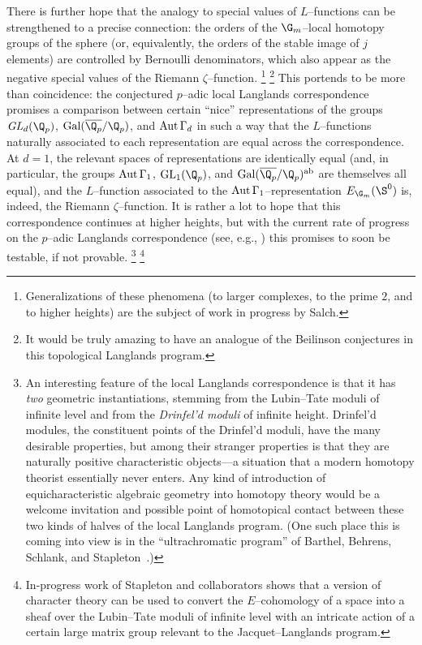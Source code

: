 There is further hope that the analogy to special values of \(L\)--functions can be strengthened to a precise connection: the orders of the \(\G_m\)--local homotopy groups of the sphere (or, equivalently, the orders of the stable image of \(j\) elements) are controlled by Bernoulli denominators, which also appear as the negative special values of the Riemann \(\zeta\)--function.%
\footnote{%
Generalizations of these phenomena (to larger complexes, to the prime \(2\), and to higher heights) are the subject of work in progress by Salch.
}%
\footnote{%
It would be truly amazing to have an analogue of the Beilinson conjectures in this topological Langlands program.
}
This portends to be more than coincidence: the conjectured \(p\)--adic local Langlands correspondence promises a comparison between certain ``nice'' representations of the groups \(\mathit{GL}_d(\Q_p)\), \(\operatorname{Gal}(\overline{\Q_p} / \Q_p)\), and \(\operatorname{Aut} \Gamma_d\) in such a way that the \(L\)--functions naturally associated to each representation are equal across the correspondence.
At \(d = 1\), the relevant spaces of representations are identically equal (and, in particular, the groups \(\operatorname{Aut} \Gamma_1\), \(\mathrm{GL}_1(\Q_p)\), and \(\operatorname{Gal}(\overline{\Q_p} / \Q_p)^{\mathrm{ab}}\) are themselves all equal), and the \(L\)--function associated to the \(\operatorname{Aut} \Gamma_1\)--representation \(E_{\G_m}(\S^0)\) is, indeed, the Riemann \(\zeta\)--function.
It is rather a lot to hope that this correspondence continues at higher heights, but with the current rate of progress on the \(p\)--adic Langlands correspondence (see, e.g., \cite{KnightThesis}) this promises to soon be testable, if not provable.%
\footnote{%
An interesting feature of the local Langlands correspondence is that it has \emph{two} geometric instantiations, stemming from the Lubin--Tate moduli of infinite level and from the \emph{Drinfel'd moduli} of infinite height.
Drinfel'd modules, the constituent points of the Drinfel'd moduli, have the many desirable properties, but among their stranger properties is that they are naturally positive characteristic objects---a situation that a modern homotopy theorist essentially never enters.
Any kind of introduction of equicharacteristic algebraic geometry into homotopy theory would be a welcome invitation and possible point of homotopical contact between these two kinds of halves of the local Langlands program.
(One such place this is coming into view is in the ``ultrachromatic program'' of Barthel, Behrens, Schlank, and Stapleton~\cite{BSS}.)
}%
\footnote{%
In-progress work of Stapleton and collaborators shows that a version of character theory can be used to convert the $E$--cohomology of a space into a sheaf over the Lubin--Tate moduli of infinite level with an intricate action of a certain large matrix group relevant to the Jacquet--Langlands program.
}







